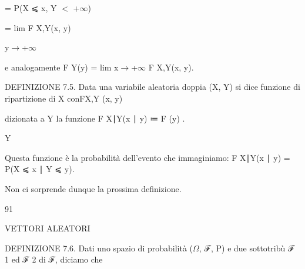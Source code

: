 \documentclass[a4paper,portrait,12pt]{article}
\begin{document}
\begin{flushleft}
= P(X ⩽ x, Y $<$ +$\infty$)
\end{flushleft}


\begin{flushleft}
= lim F X,Y(x, y)
\end{flushleft}


\begin{flushleft}
y$\rightarrow$+$\infty$
\end{flushleft}





\begin{flushleft}
e analogamente F Y(y) = lim x$\rightarrow$+$\infty$ F X,Y(x, y).
\end{flushleft}


\begin{flushleft}
DEFINIZIONE 7.5. Data una variabile aleatoria doppia (X, Y) si dice funzione di ripartizione di X conFX,Y (x, y)
\end{flushleft}


\begin{flushleft}
dizionata a Y la funzione F X∣Y(x ∣ y) ≔ F (y) .
\end{flushleft}


\begin{flushleft}
Y
\end{flushleft}





\begin{flushleft}
Questa funzione \`{e} la probabilit\`{a} dell'evento che immaginiamo: F X∣Y(x ∣ y) = P(X ⩽ x ∣ Y ⩽ y).
\end{flushleft}


\begin{flushleft}
Non ci sorprende dunque la prossima definizione.
\end{flushleft}


91










\begin{flushleft}
VETTORI ALEATORI
\end{flushleft}





\begin{flushleft}
DEFINIZIONE 7.6. Dati uno spazio di probabilit\`{a} ($\Omega$, ℱ, P) e due sottotribù ℱ 1 ed ℱ 2 di ℱ, diciamo che
\end{flushleft}
\end{document}
